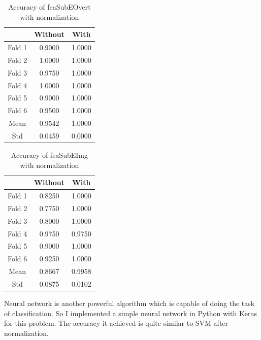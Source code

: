\documentclass{article}
\begin{document}
\begin{table}[htbp]
	\centering
	\begin{tabular}{|c|c|c|} \hline
		& Without & With\\ \hline 
		Fold 1   &  0.9000  &  1.0000 \\ \hline
		Fold 2   &  1.0000  &  1.0000 \\ \hline
		Fold 3   &  0.9750  &  1.0000 \\ \hline
		Fold 4   &  1.0000  &  1.0000 \\ \hline
		Fold 5   &  0.9000  &  1.0000 \\ \hline
		Fold 6   &  0.9500  &  1.0000 \\ \hline
		Mean     &  0.9542  &  1.0000 \\ \hline
		Std		 &	0.0459  &  0.0000  \\ \hline
	\end{tabular}
	\caption{Accuracy of feaSubEOvert with normalization}
\end{table}
\vspace{1in}
\begin{table}[htbp]
	\centering
	\begin{tabular}{|c|c|c|} \hline
		& Without & With\\ \hline 
		Fold 1   &  0.8250  &  1.0000 \\ \hline
		Fold 2   &  0.7750  &  1.0000 \\ \hline
		Fold 3   &  0.8000  &  1.0000 \\ \hline
		Fold 4   &  0.9750  &  0.9750 \\ \hline
		Fold 5   &  0.9000  &  1.0000 \\ \hline
		Fold 6   &  0.9250  &  1.0000 \\ \hline
		Mean     &  0.8667  &  0.9958 \\ \hline
		Std		 &	0.0875  &  0.0102  \\ \hline
	\end{tabular}
	\caption{Accuracy of feaSubEImg with normalization}
\end{table}

Neural network is another powerful algorithm which is capable of doing the task of classification. So I implemented a simple neural network in Python with Keras for this problem. The accuracy it achieved is quite similar to SVM after normalization.
\end{document}
